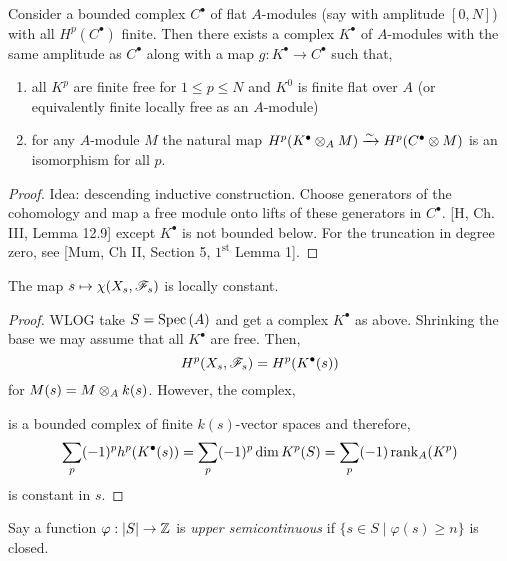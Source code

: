 \documentclass[12pt]{article}
\begin{document}
\begin{lemma}
Consider a bounded complex $C^\bullet$ of flat $A$-modules (say with amplitude $[0,N]$) with all $H^p(C^\bullet)$ finite. Then there exists a complex $K^\bullet$ of $A$-modules with the same amplitude as $C^\bullet$ along with a map $g : K^\bullet \to C^\bullet$ such that,
\begin{enumerate}
\item all $K^p$ are finite free for $1 \le p \le N$ and $K^0$ is finite flat over $A$ (or equivalently finite locally free as an $A$-module)
\item for any $A$-module $M$ the natural map $H^p(K^\bullet \otimes_A M) \xrightarrow{\sim} H^p(C^\bullet \otimes M)$ is an isomorphism for all $p$. 
\end{enumerate}
\end{lemma}

\begin{proof}
Idea: descending inductive construction. Choose generators of the cohomology and map a free module onto lifts of these generators in $C^\bullet$. [H, Ch. III, Lemma 12.9] except $K^\bullet$ is not bounded below. For the truncation in degree zero, see [Mum, Ch II, Section 5, $1^{\text{st}}$ Lemma 1]. 
\end{proof}

\begin{corollary}
The map $s \mapsto \chi(X_s, \mathscr{F}_s)$ is locally constant.
\end{corollary}

\begin{proof}
WLOG take $S = \mathrm{Spec}\left( A \right)$ and get a complex $K^\bullet$ as above. Shrinking the base we may assume that all $K^\bullet$ are free. Then,
\[ H^p(X_s, \mathscr{F}_s) = H^p(K^\bullet(s)) \]
for $M(s) = M \otimes_A k(s)$. However, the complex,
\begin{center}
\end{center}
is a bounded complex of finite $k(s)$-vector spaces and therefore,
\[ \sum_p (-1)^p h^p(K^\bullet(s)) = \sum_p (-1)^p \dim{K^p(S)} = \sum_p (-1) \operatorname{\mathrm{rank}}_A (K^p) \]
is constant in $s$. 
\end{proof}

\begin{definition}
Say a function $\varphi : |S| \to \mathbb{Z}$ is \textit{upper semicontinuous} if $\{s \in S \mid \varphi(s) \ge n \}$ is closed. 
\end{definition}
\end{document}
